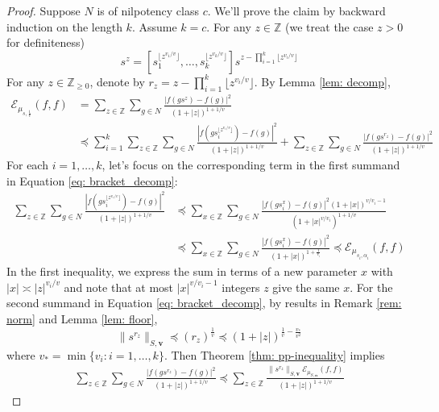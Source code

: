 \documentclass[pdflatex,sn-mathphys-num]{sn-jnl}%
\theoremstyle{thmstyleone}%
\theoremstyle{thmstyletwo}%
\theoremstyle{thmstylethree}%
\begin{document}
\begin{proof}
Suppose $N$ is of nilpotency class $c$. We'll prove the claim by backward induction on the length $k$. Assume $k = c$. For any $z \in \mathbb{Z}$ (we treat the case $z>0$ for definiteness) 
    $$s^z = \left[s_{1}^{\lfloor z^{v_1/v }\rfloor }, \ldots, s_{k}^{\lfloor z^{ v_k/v}\rfloor}\right] s^{
    z - \prod_{i=1}^k \lfloor z^{ v_i /v}\rfloor}$$
For any $z\in \mathbb{Z}_{\ge 0}$, denote by $r_z =  z - \prod_{i=1}^k \lfloor z^{ v_i /v}\rfloor$. By Lemma \ref{lem: decomp}, 
\begin{align}
    \mathcal{E}_{\mu_{s,\frac{1}{v}}} (f,f) & =  \sum_{z\in \mathbb{Z}} \sum_{g \in N} \frac{|f(g s^z) - f(g)|^2}{(1 + |z|)^{1+ 1/v}} \nonumber\\
     & \preccurlyeq \sum_{i=1}^k \sum_{z\in \mathbb{Z}}\sum_{g \in N}  \frac{\left|f\left(g s_{i}^{\lfloor z^{ v_i /v}\rfloor}\right) - f(g)\right|^2}{(1 + |z|)^{1+ 1/v}} + \sum_{z\in \mathbb{Z}}\sum_{g \in N}  \frac{\left|f\left(gs^{r_z}\right) - f(g)\right|^2}{(1 + |z|)^{1+ 1/v}} \label{eq: bracket_decomp}
\end{align}
For each $i=1,\ldots, k$, let's focus on the corresponding term in the first summand in Equation \ref{eq: bracket_decomp}:
\begin{align*}
    \sum_{z\in \mathbb{Z}}\sum_{g \in N}  \frac{\left|f\left(gs_{i}^{\lfloor z^{ v_i /v}\rfloor}\right) - f(g)\right|^2}{(1 + |z|)^{1+ 1/v}} & \preccurlyeq  \sum_{x \in \mathbb{Z}} \sum_{g \in N} \frac{|f(g s_i^x) - f(g)|^2(1+|x|)^{
    v/v_i
    -1}}{(1 + |x|^{ 
    v/v_i})^{1+1/v}} \\ 
    & \preccurlyeq \sum_{x \in \mathbb{Z}} \sum_{g \in N} \frac{|f(g s_i^x) - f(g)|^2}{(1 + |x|)^{1+\frac{1}{v_i}}} \preccurlyeq \mathcal{E}_{\mu_{s_i,\alpha_i}} (f,f)  
\end{align*}
In the first inequality, we express the sum in terms of a new parameter $x$ with $|x|\asymp |z|^{v_i /v}$ and note that at most $|x|^{v/v_i-1}$ integers $z$ give the same $x$. For the
second summand in Equation \ref{eq: bracket_decomp}, by results in Remark \ref{rem: norm}  and 
Lemma \ref{lem: floor}, 
$$\|s^{r_z}\|_{S,\mathbf{v}} \preccurlyeq (r_z)^\frac{1}{v} \preccurlyeq (1+|z|)^{\frac{1}{v} - \frac{v_*}{v^2}}$$
    where $v_* = \min \{v_i: i=1,\ldots,k \}$. 
Then Theorem \ref{thm: pp-inequality} implies 
    \begin{align*}
    \sum_{z\in \mathbb{Z}}\sum_{g \in N}  \frac{\left|f\left(gs^{r_z}\right) - f(g)\right|^2}{(1 + |z|)^{1+ 1/v}} \preccurlyeq   \sum_{z\in \mathbb{Z}}\frac{    \|s^{r_z}\|_{S ,\mathbf{v} } \mathcal{E}_{\mu_{S,\bm{\alpha}}} (f,f)   }{(1 + |z|)^{1+ 1/v}}

\end{align*}
\end{proof}
\end{document}
